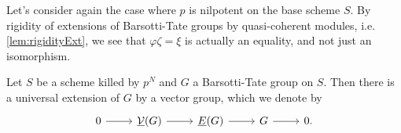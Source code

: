 \begin{rem}[]
	Let's consider again the case where $p$ is 
	nilpotent on the base scheme $S$.
	By rigidity of extensions of Barsotti-Tate groups
	by quasi-coherent modules, i.e. \cref{lem:rigidityExt}, 
	we see that $\varphi\zeta = \xi$ is
	actually an equality, and not just an isomorphism.
\end{rem}


\begin{prop}[]\label{UniversalExtensionConstruction}
	Let $S$ be a scheme killed by $p^N$ and $G$
	a Barsotti-Tate group on $S$.
	Then there is a universal extension of $G$ by a vector group,
	which we denote by
	\begin{equation*}
	\begin{tikzcd}
		0 \arrow[r, "", rightarrow] &
		\underline{\mathcal{V}}(G) \arrow[r, "", rightarrow] &
		\underline{E}(G) \arrow[r, "", rightarrow] &
		G \arrow[r, "", rightarrow] &
		0
	.\end{tikzcd}
	\end{equation*}
\end{prop}
